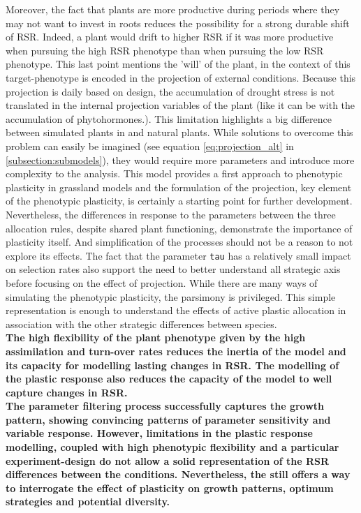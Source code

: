 Moreover, the fact that plants are more productive during periods where they may not want to invest in roots reduces the possibility for a strong durable shift of RSR. Indeed, a plant would drift to higher RSR if it was more productive when pursuing the high RSR phenotype than when pursuing the low RSR phenotype. This last point mentions the 'will' of the plant, in the context of \model this target-phenotype is encoded in the projection of external conditions. Because this projection is daily based on design, the accumulation of drought stress is not translated in the internal projection variables of the plant (like it can be with the accumulation of phytohormones.). This limitation highlights a big difference between simulated plants in \model and natural plants. While solutions to overcome this problem can easily be imagined (see equation \ref{eq:projection_alt} in \ref{subsection:submodels}), they would require more parameters and introduce more complexity to the analysis. This model provides a first approach to phenotypic plasticity in grassland models and the formulation of the projection, key element of the phenotypic plasticity, is certainly a starting point for further development. Nevertheless, the differences in response to the parameters between the three allocation rules, despite shared plant functioning, demonstrate the importance of plasticity itself. And simplification of the processes should not be a reason to not explore its effects. The fact that the parameter \texttt{tau} has a relatively small impact on selection rates also support the need to better understand all strategic axis before focusing on the effect of projection. While there are many ways of simulating the phenotypic plasticity, the parsimony is privileged. This simple representation is enough to understand the effects of active plastic allocation in association with the other strategic differences between species.\\

\textbf{The high flexibility of the plant phenotype given by the high assimilation and turn-over rates reduces the inertia of the model and its capacity for modelling lasting changes in RSR. The modelling of the plastic response also reduces the capacity of the model to well capture changes in RSR. }\\

\textbf{The parameter filtering process successfully captures the growth pattern, showing convincing patterns of parameter sensitivity and variable response. However, limitations in the plastic response modelling, coupled with high phenotypic flexibility and a particular experiment-design do not allow a solid representation of the RSR differences between the conditions. Nevertheless, the \model still offers a way to interrogate the effect of plasticity on growth patterns, optimum strategies and potential diversity.}

